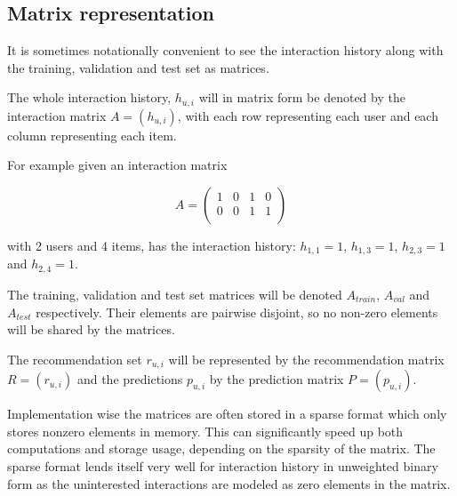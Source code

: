 
\subsection{Matrix representation}\label{sec:background:theory:matrix}

It is sometimes notationally convenient to see the interaction history along with the training, validation and test set as matrices.

The whole interaction history, $h_{u, i}$ will in matrix form be denoted by the interaction matrix $A = (h_{u, i})$, with each row representing each user and each column representing each item.

For example given an interaction matrix

\begin{equation}
    A =
    \begin{pmatrix}
        1 & 0 & 1 & 0 \\
        0 & 0 & 1 & 1 \\
    \end{pmatrix}
\end{equation}

with 2 users and 4 items, has the interaction history: $h_{1, 1} = 1$, $h_{1, 3} = 1$, $h_{2, 3} = 1$ and $h_{2, 4} = 1$.

The training, validation and test set matrices will be denoted $A_{train}$, $A_{val}$ and $A_{test}$ respectively. Their elements are pairwise disjoint, so no non-zero elements will be shared by the matrices.

The recommendation set $r_{u, i}$ will be represented by the recommendation matrix $R = (r_{u, i})$ and the predictions $p_{u, i}$ by the prediction matrix $P = (p_{u, i})$.

Implementation wise the matrices are often stored in a sparse format which only stores nonzero elements in memory. This can significantly speed up both computations and storage usage, depending on the sparsity of the matrix. The sparse format lends itself very well for interaction history in unweighted binary form as the uninterested interactions are modeled as zero elements in the matrix.


